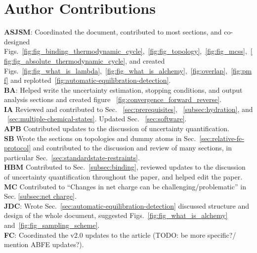 \documentclass[9pt,bestpractices]{livecoms}
\begin{document}
\section*{Author Contributions}
%
\textbf{ASJSM}: Coordinated the document, contributed to most sections, and co-designed Figs.~\ref{fig:fig_binding_thermodynamic_cycle},~\ref{fig:fig_topology},~\ref{fig:fig_mcss},~\ref{fig:fig_absolute_thermodynamic_cycle}, and created Figs.~\ref{fig:fig_what_is_lambda},~\ref{fig:fig_what_is_alchemy},~\ref{fig:overlap},~\ref{fig:pmf} and replotted~\ref{fig:automatic-equilibration-detection}.\\
\textbf{BA}: Helped write the uncertainty estimation, stopping conditions, and output analysis sections and created figure ~\ref{fig:convergence_forward_reverse}.\\
\textbf{IA} Reviewed and contributed to Sec. ~\ref{sec:prerequisites}, ~\ref{subsec:hydration}, and ~\ref{sec:multiple-chemical-states}. Updated Sec. ~\ref{sec:software}.\\
\textbf{APB} Contributed updates to the discussion of uncertainty quantification.\\
\textbf{SB} Wrote the sections on topologies and dummy atoms in Sec.~\ref{sec:relative-fe-protocol} and contributed to the discussion and review of many sections, in particular Sec.~\ref{sec:standardstate-restraints}.\\
\textbf{HBM} Contributed to Sec.~\ref{subsec:binding}, reviewed updates to the discussion of uncertainty quantification throughout the paper, and helped edit the paper.\\
\textbf{MC} Contributed to ``Changes in net charge can be challenging/problematic'' in Sec. \ref{subsec:net charge}. \\
\textbf{JDC}: Wrote Sec.~\ref{sec:automatic-equilibration-detection} discussed structure and design of the whole document, suggested Figs.~\ref{fig:fig_what_is_alchemy} and~\ref{fig:fig_sampling_scheme}. \\
\textbf{FC}: Coordinated the v2.0 updates to the article (TODO: be more specific?/ mention ABFE updates?). \\
\end{document}
